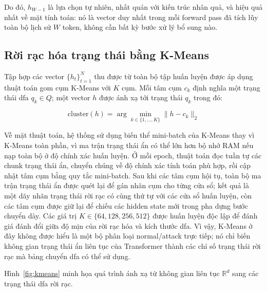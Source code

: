 \documentclass[../main.tex]{subfiles}
\begin{document}
Do đó, $h_{W-1}$ là lựa chọn tự nhiên, nhất quán với kiến trúc nhân quả, và hiệu
quả nhất về mặt tính toán: nó là vector duy nhất trong mỗi forward
pass đã tích lũy
toàn bộ lịch sử $W$ token, không cần bất kỳ bước xử lý bổ sung nào.

\subsection{Rời rạc hóa trạng thái bằng K-Means}
\label{sec:kmeans}

Tập hợp các vector $\{h_t\}_{t=1}^{N}$ thu được từ toàn bộ tập huấn
luyện được áp dụng
thuật toán gom cụm K-Means \cite{lloyd1982kmeans} với $K$ cụm. Mỗi
tâm cụm $c_k$ định nghĩa
một trạng thái
\gls{dfa} $q_k \in Q$; một vector $h$ được ánh xạ tới trạng thái $q_k$ trong đó:

\begin{equation}
  \label{eq:kmeans}
  \text{cluster}(h) = \arg\min_{k \in \{1,\ldots,K\}} \|h - c_k\|_2
\end{equation}

Về mặt thuật toán, hệ thống sử dụng biến thể mini-batch của K-Means
\cite{sculley2010webscale}
thay vì K-Means toàn
phần, vì ma trận trạng thái ẩn có thể lớn hơn bộ nhớ RAM nếu nạp toàn
bộ ở độ chính xác
huấn luyện. Ở mỗi epoch, thuật toán đọc tuần tự các chunk trạng thái
ẩn, chuyển chúng về
độ chính xác tính toán phù hợp, rồi cập nhật tâm cụm bằng quy tắc
mini-batch. Sau khi
các tâm cụm hội tụ, toàn bộ ma trận trạng thái ẩn được quét lại để
gán nhãn cụm cho
từng cửa sổ; kết quả là một dãy nhãn trạng thái rời rạc có cùng thứ
tự với các cửa sổ
huấn luyện, còn các tâm cụm được giữ lại để chiếu các hidden state
mới trong pha dựng
bước chuyển dày. Các giá trị $K \in \{64,128,256,512\}$ được huấn
luyện độc lập để đánh
giá đánh đổi giữa độ mịn của rời rạc hóa và kích thước \gls{dfa}. Vì vậy,
K-Means ở đây không
được hiểu là một bộ phân loại normal/attack trực tiếp; nó chỉ biến
không gian trạng thái
ẩn liên tục của Transformer thành các chỉ số trạng thái rời rạc mà
bảng chuyển \gls{dfa} có
thể sử dụng.

Hình~\ref{fig:kmeans} minh họa quá trình ánh xạ từ không gian liên
tục $\mathbb{R}^d$
sang các trạng thái \gls{dfa} rời rạc.
\end{document}
